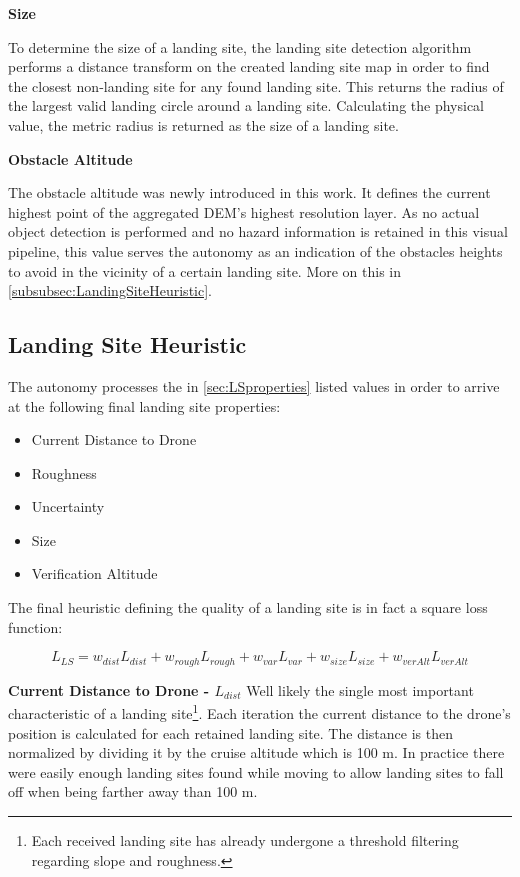 \textbf{Size}

To determine the size of a landing site, the landing site detection algorithm performs a distance transform on the created landing site map in order to find the closest non-landing site for any found landing site. This returns the radius of the largest valid landing circle around a landing site. Calculating the physical value, the metric radius is returned as the size of a landing site.

\textbf{Obstacle Altitude}\label{subsec:obstacle_altitude}

The obstacle altitude was newly introduced in this work. It defines the current highest point of the aggregated DEM's highest resolution layer. As no actual object detection is performed and no hazard information is retained in this visual pipeline, this value serves the autonomy as an indication of the obstacles heights to avoid in the vicinity of a certain landing site. More on this in \cref{subsubsec:LandingSiteHeuristic}.

\subsection{Landing Site Heuristic}

The autonomy processes the in \cref{sec:LSproperties} listed values in order to arrive at the following final landing site properties:

\begin{itemize}
    \item Current Distance to Drone
    \item Roughness
    \item Uncertainty
    \item Size
    \item Verification Altitude
\end{itemize}

The final heuristic defining the quality of a landing site is in fact a square loss function:

\begin{equation}
    L_{LS} = w_{dist}L_{dist} + w_{rough}L_{rough} + w_{var}L_{var} + w_{size}L_{size} + w_{verAlt}L_{verAlt}
    \label{eq:loss_fct}
\end{equation}

\textbf{Current Distance to Drone - $L_{dist}$}
Well likely the single most important characteristic of a landing site\footnote[1]{Each received landing site has already undergone a threshold filtering regarding slope and roughness.}. Each iteration the current distance to the drone's position is calculated for each retained landing site. The distance is then normalized by dividing it by the cruise altitude which is 100 m. In practice there were easily enough landing sites found while moving to allow landing sites to fall off when being farther away than 100 m.

